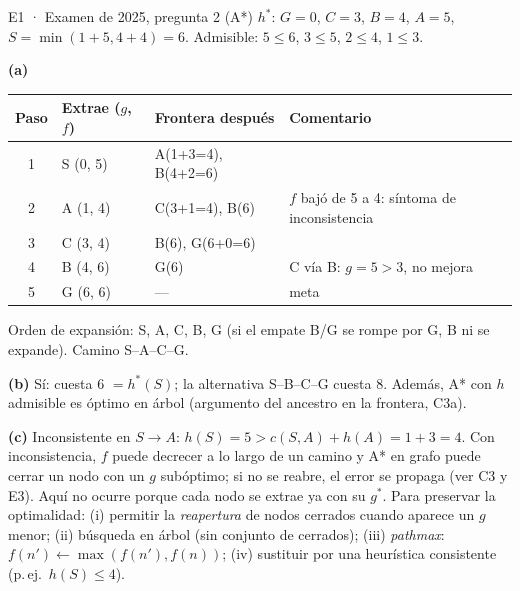 \begin{solucion}{E1 · Examen de 2025, pregunta 2 (A*)}
$h^*$: $G=0$, $C=3$, $B=4$, $A=5$, $S=\min(1+5,4+4)=6$. Admisible: $5\le6$, $3\le5$, $2\le4$, $1\le3$.

\textbf{(a)}
\begin{center}\small
\begin{tabular}{clll}
\toprule
Paso & Extrae ($g$, $f$) & Frontera después & Comentario\\
\midrule
1 & S (0, 5) & A(1+3=4), B(4+2=6) & \\
2 & A (1, 4) & C(3+1=4), B(6) & $f$ bajó de 5 a 4: síntoma de inconsistencia\\
3 & C (3, 4) & B(6), G(6+0=6) & \\
4 & B (4, 6) & G(6) & C vía B: $g=5>3$, no mejora\\
5 & G (6, 6) & — & meta\\
\bottomrule
\end{tabular}
\end{center}
Orden de expansión: S, A, C, B, G (si el empate B/G se rompe por G, B ni se expande). Camino S–A–C–G.

\textbf{(b)} Sí: cuesta 6 $=h^*(S)$; la alternativa S–B–C–G cuesta 8. Además, A* con $h$ admisible es
óptimo en árbol (argumento del ancestro en la frontera, C3a).

\textbf{(c)} Inconsistente en $S\to A$: $h(S)=5>c(S,A)+h(A)=1+3=4$. Con inconsistencia, $f$ puede decrecer a
lo largo de un camino y A* en grafo puede cerrar un nodo con un $g$ subóptimo; si no se reabre, el error
se propaga (ver C3 y E3). Aquí no ocurre porque cada nodo se extrae ya con su $g^*$. Para preservar la
optimalidad: (i) permitir la \emph{reapertura} de nodos cerrados cuando aparece un $g$ menor; (ii) búsqueda
en árbol (sin conjunto de cerrados); (iii) \emph{pathmax}: $f(n')\leftarrow\max(f(n'),f(n))$; (iv) sustituir por una
heurística consistente (p.\,ej.\ $h(S)\le4$).
\end{solucion}

